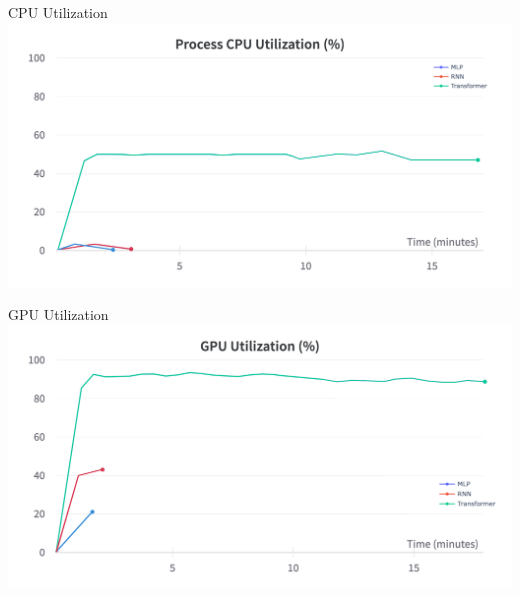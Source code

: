 \begin{frame}{CPU Utilization}
    \includegraphics[width=\textwidth]{sections/4_models/imgs/cpuinsieme.png}
\end{frame}

\begin{frame}{GPU Utilization}
    \includegraphics[width=\textwidth]{sections/4_models/imgs/gpuinsieme.png}
\end{frame}